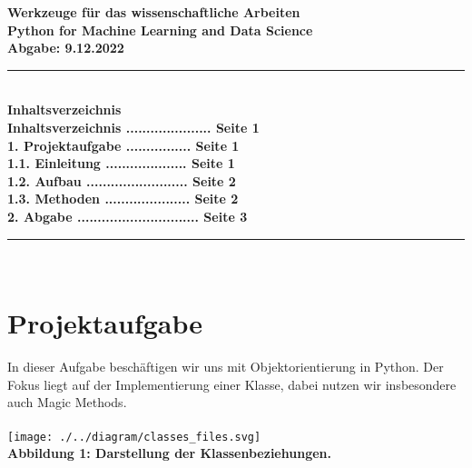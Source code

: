 \documentclass[]{article}
\begin{document}
\bf 
\Large\noindent  Werkzeuge für das wissenschaftliche Arbeiten\\
\normalsize Python for Machine Learning and Data Science\\
\normalfont \hspace*{4.5cm}Abgabe: 9.12.2022\\
\hrule\hfill\\[0.2cm]
\bf \large Inhaltsverzeichnis \normalsize \normalfont\\[0.5cm]
\hspace*{0.5cm} Inhaltsverzeichnis ..................... Seite 1 \\[0.2cm]
\hspace*{0.5cm} \bf 1. Projektaufgabe \normalfont ................ Seite 1 \\
\hspace*{1cm}  1.1. Einleitung .................... Seite 1 \\
\hspace*{1cm}  1.2. Aufbau ......................... Seite 2 \\
\hspace*{1cm}  1.3. Methoden ..................... Seite 2 \\[0.2cm]
\hspace*{0.5cm} \bf 2. Abgabe \normalfont .............................. Seite 3 \\
\hrule\hfill\\[0.2cm]
\section{\bf \large Projektaufgabe \normalsize \normalfont\\[0.5cm]}
In dieser Aufgabe beschäftigen wir uns mit Objektorientierung in Python.
Der Fokus liegt auf der Implementierung einer Klasse, dabei nutzen wir insbesondere auch Magic Methods.\\
\\
\hspace*{2cm}\texttt{[image: ./../diagram/classes\_files.svg]}\\
\hspace*{3cm}\scriptsize\bf Abbildung 1: \normalfont Darstellung der Klassenbeziehungen.\normalsize\\
\end{document}
